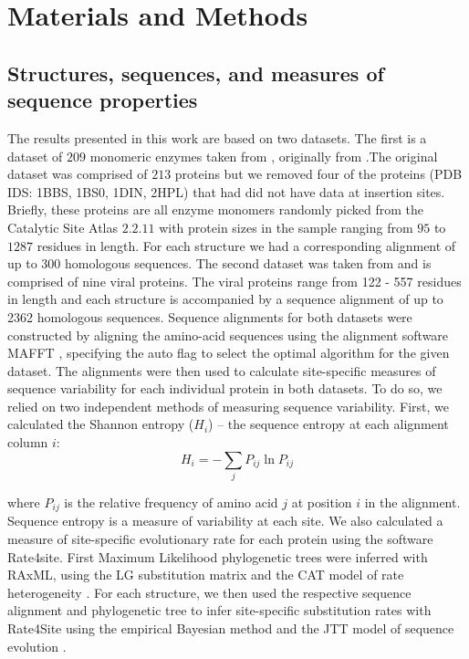 \documentclass[12pt]{article}
\begin{document}
\section{Materials and Methods}
\label{sec:mam}

    \subsection*{Structures, sequences, and measures of sequence properties } 
    The results presented in this work are based on two datasets. The first is a dataset of $209$ monomeric enzymes taken from \cite{Huangetal2014}, originally from \cite{Yehetal2014}.The original dataset was comprised of $213$ proteins but we removed four of the proteins (PDB IDS: 1BBS, 1BS0, 1DIN, 2HPL) that had did not have data at insertion sites. Briefly, these proteins are all enzyme monomers   randomly picked from the Catalytic Site Atlas $2.2.11$ \citep{Porteretal2004} with protein sizes in the sample ranging from $95$ to $1287$ residues in length. For each structure we had a corresponding alignment of up to 300 homologous sequences.  The second dataset was taken from \cite{Shahmoradietal2014} and is comprised of nine viral proteins. The viral proteins range from 122 - 557 residues in length and each structure is accompanied by a sequence alignment of up to 2362 homologous sequences. Sequence alignments for both datasets were constructed by aligning the amino-acid sequences using the alignment software MAFFT \citep{Katohetal2002, Katohetal2005}, specifying the auto flag to select the optimal algorithm for the given dataset. The alignments were then used to calculate site-specific measures of sequence variability for each individual protein in both datasets. To do so, we relied on two independent methods of measuring sequence variability. First, we calculated the Shannon entropy ($H_i$) -- the sequence entropy at each alignment column $i$:
    \begin{equation}
        \label{eqn:shannon}
        H_i = -\sum_j P_{ij}\ln P_{ij}
    \end{equation}

    where $P_{ij}$ is the relative frequency of amino acid $j$ at position $i$ in the alignment. Sequence entropy is a measure of variability at each site. We also calculated a measure of site-specific evolutionary rate for each protein using the software Rate4site. First Maximum Likelihood phylogenetic trees were inferred with RAxML, using the LG substitution matrix and the CAT model of rate heterogeneity \citep{Stamatakis2006, Stamatakis2014}. For each structure, we then used the respective sequence alignment and phylogenetic tree to infer site-specific substitution rates with Rate4Site using the empirical Bayesian method and the JTT model of sequence evolution \citep{Mayroseetal2004}.
\end{document}
